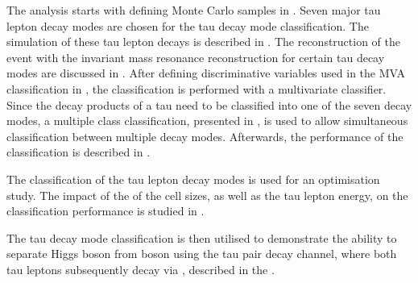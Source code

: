 The analysis starts with defining Monte Carlo samples in . Seven major tau lepton decay modes are chosen for the tau decay mode classification. The simulation of these tau lepton decays is described in .  The reconstruction of the event with the invariant mass resonance reconstruction for certain tau decay modes are discussed in .  After defining discriminative variables used in the MVA classification in , the classification is performed with a multivariate classifier. Since the decay products of a tau need to be classified into one of the seven decay modes, a multiple class classification, presented in , is used to allow simultaneous classification between  multiple decay modes. Afterwards, the performance of the classification is described in .


The classification of the tau lepton decay modes is used for an \ECAL optimisation study. The impact of the of the \ECAL cell sizes,  as well as the tau lepton energy,  on the classification performance is studied in .

The tau decay mode classification is then utilised to demonstrate the ability to separate Higgs boson from \PZ  boson using the tau pair decay channel, where both tau leptons subsequently decay   via  \tauToPion, described in the .



